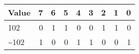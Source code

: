 \begin{tabular}{lrrrrrrrr}
\hline
 Value   &   7 &   6 &   5 &   4 &   3 &   2 &   1 &   0 \\
\hline
 102     &   0 &   1 &   1 &   0 &   0 &   1 &   1 &   0 \\
 \textasciitilde{}102    &   1 &   0 &   0 &   1 &   1 &   0 &   0 &   1 \\
\hline
\end{tabular}